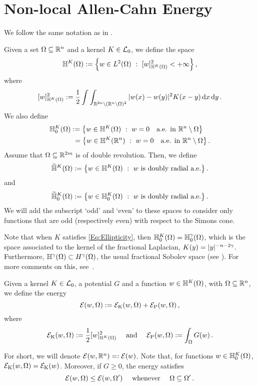 \section{Non-local Allen-Cahn Energy}
\label{Sec:Nonlocal_AllenCahn_Energy}

We follow the same notation as in \cite{CozziPassalacqua}.


\begin{definition}
\label{Def:FunctionalSpaceHK}
Given a set $\Omega \subseteq \mathbb{R}^n$ and a kernel $K \in \mathcal{L}_0$, we define the space
$$
\mathbb{H}^K(\Omega) := \left \{ w \in L^2(\Omega) \ : \ [w]^2_{\mathbb{H}^K(\Omega)} < + \infty \right \},
$$
where
$$
[w]^2_{\mathbb{H}^K(\Omega)} := \dfrac{1}{2}\int\int_{\mathbb{R}^{2n} \setminus (\mathbb{R}^n\setminus\Omega)^2} |w(x) - w(y)|^2 K(x-y) \,\mathrm{d} x \,\mathrm{d} y\,.
$$
We also define
\begin{align*}
	\mathbb{H}^K_0(\Omega) &:= \left \{ w \in \mathbb{H}^K(\Omega) \ : \  w = 0 \quad \textrm{a.e. in } \mathbb{R}^n \setminus \Omega \right \} \\
	&\ = \left \{ w \in \mathbb{H}^K(\mathbb{R}^n) \ : \  w = 0 \quad \textrm{a.e. in } \mathbb{R}^n \setminus \Omega \right \}.
\end{align*}
Assume that $\Omega \subseteq \mathbb{R}^{2m}$ is of double revolution. Then, we define
$$
\widetilde{\mathbb{H}}^K(\Omega) := \left \{ w \in \mathbb{H}^K(\Omega) \ : \ w \textrm{ is doubly radial a.e.} \right \}.
$$
and
$$
\widetilde{\mathbb{H}}^K_0(\Omega) := \left \{ w \in \mathbb{H}^K_0(\Omega) \ : \ w \textrm{ is doubly radial a.e.} \right \}.
$$
We will add the subscript `odd' and `even' to these spaces to consider only functions that are odd (respectively even) with respect to the Simons cone.
\end{definition}


Note that when $K$ satisfies \eqref{Eq:Ellipticity}, then $\mathbb{H}^K_0 (\Omega) = \mathbb{H}^\gamma_0 (\Omega)$, which is the space associated to the kernel of the fractional Laplacian, $K(y) = |y|^{-n-2\gamma}$. Furthermore, $\mathbb{H}^\gamma(\Omega) \subset H^\gamma(\Omega)$, the usual fractional Sobolev space (see \cite{HitchhikerGuide}).  For more comments on this, see~\cite{CozziPassalacqua}.

\begin{definition}
\label{Def:Energy}
Given a kernel $K \in \mathcal{L}_0$, a potential $G$ and a function $w\in \mathbb{H}^K(\Omega)$, with $\Omega\subseteq \mathbb{R}^{n}$, we define the energy
$$
\mathcal{E}(w, \Omega) := \mathcal{E}_\mathrm{K}(w,\Omega) + \mathcal{E}_\mathrm{P}(w,\Omega)\,, 
$$
where
$$
\mathcal{E}_\mathrm{K}(w, \Omega) := \dfrac{1}{2} [w]^2_{\mathbb{H}^K(\Omega)} \quad \text{ and } \quad  \mathcal{E}_\mathrm{P}(w, \Omega) := \int_{\Omega} G(w) 
\,.
$$
\end{definition}
For short, we will denote $\mathcal{E}(w, \mathbb{R}^n) =: \mathcal{E}(w)$. Note that, for functions $w\in \mathbb{H}^K_0(\Omega)$, $\mathcal{E}_\mathrm{K}(w,\Omega) = \mathcal{E}_\mathrm{K}(w)$. Moreover, if $G\geq 0$, the energy satisfies
$$
\mathcal{E}(w, \Omega) \leq \mathcal{E}(w, \Omega') \quad \text{ whenever } \quad \Omega \subseteq \Omega'\,.
$$





